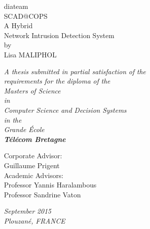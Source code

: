\documentclass[11pt,]{article}
\begin{document}
\begin{center}

\vspace{30mm}

{\Huge diateam}\\
\bigskip
{\Huge SCAD@COPS}\\
\bigskip
\bigskip
{\Huge A Hybrid}\\
{\Huge Network Intrusion Detection System}\\
\vspace{15mm}
{\Large by}\\
\vspace{10mm}
{\huge Lisa MALIPHOL}\\

\vspace{25mm}

\textit{A thesis submitted in partial satisfaction of the}\\
\medskip
\textit{requirements for the diploma of the}\\
\medskip
\textit{Masters of Science}\\
\medskip
\textit{in}\\
\medskip
\textit{Computer Science and Decision Systems}\\
\medskip
\textit{in the}\\
\medskip
\textit{Grande École}\\
\medskip
\textbf{\textit{\Large Télécom Bretagne}}\\

\vspace{15mm}

Corporate Advisor:\\
\smallskip
Guillaume Prigent\\
\bigskip
\medskip
Academic Advisors:\\
\smallskip
Professor Yannis Haralambous\\
Professor Sandrine Vaton\\

\vspace{15mm}

\textit{September 2015}\\
\medskip
\textit{Plouzané, FRANCE}\\

\end{center}

\thispagestyle{empty} \newpage
\mbox{} \thispagestyle{empty}

\newpage
\end{document}
